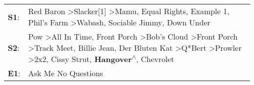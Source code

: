 \begin{supertabular}{p{0.03\textwidth}p{0.92\textwidth}}
 \textbf{S1}:  &                                                                                                                                                                                                                                                             Red Baron\textsuperscript{} \textgreater \enspace Slacker[1]\textsuperscript{} \textgreater \enspace Mamu\textsuperscript{}, \enspace Equal Rights\textsuperscript{}, \enspace Example 1\textsuperscript{}, \enspace Phil's Farm\textsuperscript{} \textgreater \enspace Wabash\textsuperscript{}, \enspace Sociable Jimmy\textsuperscript{}, \enspace Down Under\textsuperscript{}  \enspace  \\
 \textbf{S2}:  &  Pow\textsuperscript{} \textgreater \enspace All In Time\textsuperscript{}, \enspace Front Porch\textsuperscript{} \textgreater \enspace Bob's Cloud\textsuperscript{} \textgreater \enspace Front Porch\textsuperscript{} \textgreater \enspace Track Meet\textsuperscript{}, \enspace Billie Jean\textsuperscript{}, \enspace Der Bluten Kat\textsuperscript{} \textgreater \enspace Q*Bert\textsuperscript{} \textgreater \enspace Prowler\textsuperscript{} \textgreater \enspace 2x2\textsuperscript{}, \enspace Cissy Strut\textsuperscript{}, \enspace \textbf{Hangover\textsuperscript{$\wedge$}}, \enspace Chevrolet\textsuperscript{}  \enspace  \\
 \textbf{E1}:  &                                                                                                                                                                                                                                                                                                                                                                                                                                                                                                                                                                                                           Ask Me No Questions\textsuperscript{}  \enspace  \\
\end{supertabular}
